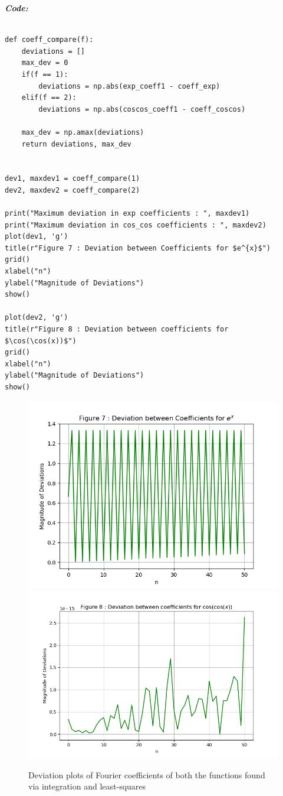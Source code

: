 \documentclass[11pt, a4paper]{article}
\begin{document}
\textit{\textbf{Code:}}
\begin{lstlisting}

def coeff_compare(f):
    deviations = []
    max_dev = 0
    if(f == 1):
        deviations = np.abs(exp_coeff1 - coeff_exp)
    elif(f == 2):
        deviations = np.abs(coscos_coeff1 - coeff_coscos)

    max_dev = np.amax(deviations)
    return deviations, max_dev


dev1, maxdev1 = coeff_compare(1)
dev2, maxdev2 = coeff_compare(2)

print("Maximum deviation in exp coefficients : ", maxdev1)
print("Maximum deviation in cos_cos coefficients : ", maxdev2)
plot(dev1, 'g')
title(r"Figure 7 : Deviation between Coefficients for $e^{x}$")
grid()
xlabel("n")
ylabel("Magnitude of Deviations")
show()

plot(dev2, 'g')
title(r"Figure 8 : Deviation between coefficients for $\cos(\cos(x))$")
grid()
xlabel("n")
ylabel("Magnitude of Deviations")
show()

\end{lstlisting}
\break

\begin{figure}[!tbh]
     \centering
     \includegraphics[scale=0.7]{./../Extras/13.png}  
     \includegraphics[scale=0.6]{./../Extras/14.png}  
     \caption{Deviation plots of Fourier coefficients of both the functions found via integration and least-squares}
\end{figure}
\break
\end{document}
